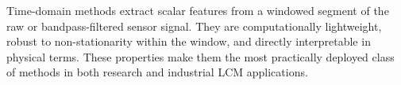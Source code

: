 Time-domain methods extract scalar features from a windowed segment of the raw or bandpass-filtered sensor signal. They are computationally lightweight, robust to non-stationarity within the window, and directly interpretable in physical terms. These properties make them the most practically deployed class of methods in both research and industrial LCM applications.

